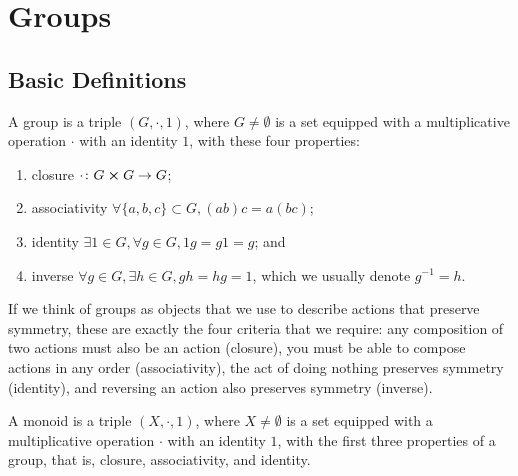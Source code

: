 \chapter{Groups}

\section{Basic Definitions}

\begin{definition}
    A group is a triple \((G,\cdot,1)\),
    where \(G \neq \emptyset\) is a set
    equipped with a multiplicative operation \(\cdot\)
    with an identity \(1\),
    with these four properties:
    \begin{enumerate}[label={(\roman*)}, itemsep=0mm]
        \item closure \(\cdot\colon G \cross G\to G\);
        \item associativity \(\forall \{a,b,c\} \subset G, (ab)c = a(bc)\);
        \item identity \(\exists 1 \in G, \forall g \in G, 1g = g1 = g\); and
        \item inverse \(\forall g \in G, \exists h \in G, gh = hg = 1\),
            which we usually denote \(g^{-1} = h\).
    \end{enumerate}
\end{definition}
\begin{remark}
    If we think of groups as objects that we use
    to describe actions that preserve symmetry,
    these are exactly the four criteria that we require:
    any composition of two actions must also be an action (closure),
    you must be able to compose actions in any order (associativity),
    the act of doing nothing preserves symmetry (identity),
    and reversing an action also preserves symmetry (inverse).
\end{remark}

\begin{definition}
    A monoid is a triple \((X,\cdot,1)\),
    where \(X \neq \emptyset\) is a set
    equipped with a multiplicative operation \(\cdot\)
    with an identity \(1\),
    with the first three properties of a group,
    that is, closure, associativity, and identity.
\end{definition}

